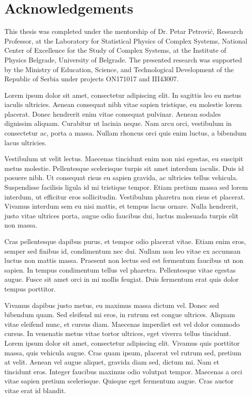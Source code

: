 
\normalsize
\chapter{Acknowledgements}


This thesis was completed under the mentorship of Dr. Petar Petrović, Research Professor, at the Laboratory for Statistical Physics of Complex Systems, National Center of Excellence for the Study of Complex Systems, at the Institute of Physics Belgrade, University of Belgrade. The presented research was supported by the Ministry of Education, Science, and Technological Development of the Republic of Serbia under projects ON171017 and III43007.

Lorem ipsum dolor sit amet, consectetur adipiscing elit. In sagittis leo eu metus iaculis ultricies. Aenean consequat nibh vitae sapien tristique, eu molestie lorem placerat. Donec hendrerit enim vitae consequat pulvinar. Aenean sodales dignissim aliquam. Curabitur ut lacinia neque. Nam arcu orci, vestibulum in consectetur ac, porta a massa. Nullam rhoncus orci quis enim luctus, a bibendum lacus ultricies.

Vestibulum ut velit lectus. Maecenas tincidunt enim non nisi egestas, eu suscipit metus molestie. Pellentesque scelerisque turpis sit amet interdum iaculis. Duis id posuere nibh. Ut consequat risus eu sapien gravida, ac ultricies tellus vehicula. Suspendisse facilisis ligula id mi tristique tempor. Etiam pretium massa sed lorem interdum, ut efficitur eros sollicitudin. Vestibulum pharetra non risus et placerat. Vivamus interdum sem eu nisi mattis, et tempus lacus ornare. Nulla hendrerit, justo vitae ultrices porta, augue odio faucibus dui, luctus malesuada turpis elit non massa.

Cras pellentesque dapibus purus, et tempor odio placerat vitae. Etiam enim eros, semper sed finibus id, condimentum nec dui. Nullam non leo vitae ex accumsan luctus non mattis massa. Praesent non lectus sed est fermentum faucibus ut non sapien. In tempus condimentum tellus vel pharetra. Pellentesque vitae egestas augue. Fusce sit amet orci in mi mollis feugiat. Duis fermentum erat quis dolor tempus porttitor.

Vivamus dapibus justo metus, eu maximus massa dictum vel. Donec sed bibendum quam. Sed eleifend mi eros, in rutrum est congue ultrices. Aliquam vitae eleifend nunc, et cursus diam. Maecenas imperdiet est vel dolor commodo cursus. In venenatis metus vitae tortor ultrices, eget viverra tellus tincidunt. Lorem ipsum dolor sit amet, consectetur adipiscing elit. Vivamus quis porttitor massa, quis vehicula augue. Cras quam ipsum, placerat vel rutrum sed, pretium at velit. Aenean vel augue aliquet, gravida diam sed, dictum mi. Nam et tincidunt eros. Integer faucibus maximus odio volutpat tempor. Maecenas a orci vitae sapien pretium scelerisque. Quisque eget fermentum augue. Cras auctor vitae erat id blandit.



\hfill

\justify
